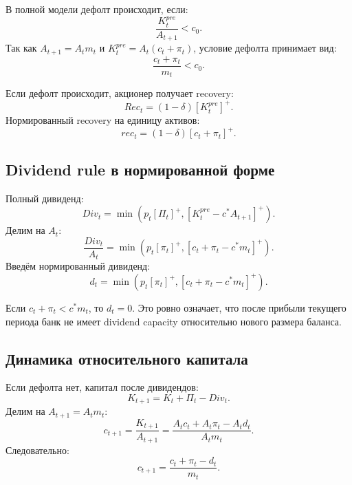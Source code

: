 \documentclass[11pt,a4paper]{article}
\newcommand{\1}{\mathbf{1}}
\newcommand{\pos}[1]{\left[#1\right]^+}
\begin{document}
В полной модели дефолт происходит, если:
\begin{equation}
    \frac{K_t^{pre}}{A_{t+1}}<c_0.
\end{equation}
Так как $A_{t+1}=A_tm_t$ и $K_t^{pre}=A_t(c_t+\pi_t)$, условие дефолта принимает вид:
\begin{equation}
    \boxed{
    \frac{c_t+\pi_t}{m_t}<c_0.
    }
\end{equation}

Если дефолт происходит, акционер получает recovery:
\begin{equation}
    Rec_t=(1-\delta)\pos{K_t^{pre}}.
\end{equation}
Нормированный recovery на единицу активов:
\begin{equation}
    \boxed{
    rec_t=(1-\delta)\pos{c_t+\pi_t}.
    }
\end{equation}

\subsection{Dividend rule в нормированной форме}

Полный дивиденд:
\begin{equation}
    Div_t=\min\left(p_t\pos{\Pi_t},\pos{K_t^{pre}-c^*A_{t+1}}\right).
\end{equation}
Делим на $A_t$:
\begin{equation}
    \frac{Div_t}{A_t}
    =
    \min\left(
        p_t\pos{\pi_t},
        \pos{c_t+\pi_t-c^*m_t}
    \right).
\end{equation}
Введём нормированный дивиденд:
\begin{equation}
    \boxed{
    d_t
    =
    \min\left(
        p_t\pos{\pi_t},
        \pos{c_t+\pi_t-c^*m_t}
    \right).
    }
\end{equation}

Если $c_t+\pi_t<c^*m_t$, то $d_t=0$. Это ровно означает, что после прибыли текущего периода банк не имеет dividend capacity относительно нового размера баланса.

\subsection{Динамика относительного капитала}

Если дефолта нет, капитал после дивидендов:
\begin{equation}
    K_{t+1}=K_t+\Pi_t-Div_t.
\end{equation}
Делим на $A_{t+1}=A_tm_t$:
\begin{equation}
    c_{t+1}
    =
    \frac{K_{t+1}}{A_{t+1}}
    =
    \frac{A_tc_t+A_t\pi_t-A_td_t}{A_tm_t}.
\end{equation}
Следовательно:
\begin{equation}
    \boxed{
    c_{t+1}=\frac{c_t+\pi_t-d_t}{m_t}.
    }
\end{equation}
\end{document}
